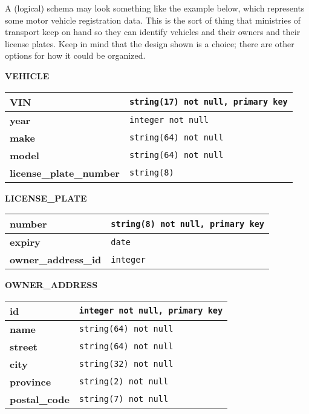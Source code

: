 A (logical) schema may look something like the example below, which represents some motor vehicle registration data. This is the sort of thing that ministries of transport keep on hand so they can identify vehicles and their owners and their license plates. Keep in mind that the design shown is a choice; there are other options for how it could be organized.
\vspace{1em}
\begin{center}
	\textbf{VEHICLE}\\
	\begin{tabular}{|l|l|}\hline
		\textbf{VIN} & \texttt{string(17) not null, primary key}\\ \hline		
		\textbf{year} & \texttt{integer not null}\\ \hline
		\textbf{make} & \texttt{string(64) not null}\\ \hline
		\textbf{model} & \texttt{string(64) not null}\\ \hline		
		\textbf{license\_plate\_number} & \texttt{string(8)}\\ \hline		
	\end{tabular}
	
	\textbf{LICENSE\_PLATE}\\
	\begin{tabular}{|l|l|}\hline
		\textbf{number} & \texttt{string(8) not null, primary key}\\ \hline
		\textbf{expiry} & \texttt{date} \\ \hline
		\textbf{owner\_address\_id} & \texttt{integer}\\ \hline		
	\end{tabular}
	
		\textbf{OWNER\_ADDRESS}\\
	\begin{tabular}{|l|l|}\hline
		\textbf{id} & \texttt{integer not null,  primary key}\\ \hline
		\textbf{name} & \texttt{string(64) not null}\\ \hline
		\textbf{street} & \texttt{string(64) not null}\\ \hline
		\textbf{city} & \texttt{string(32) not null}\\ \hline
		\textbf{province} & \texttt{string(2) not null}\\ \hline
		\textbf{postal\_code} & \texttt{string(7) not null}\\ \hline

	\end{tabular}
\end{center}

